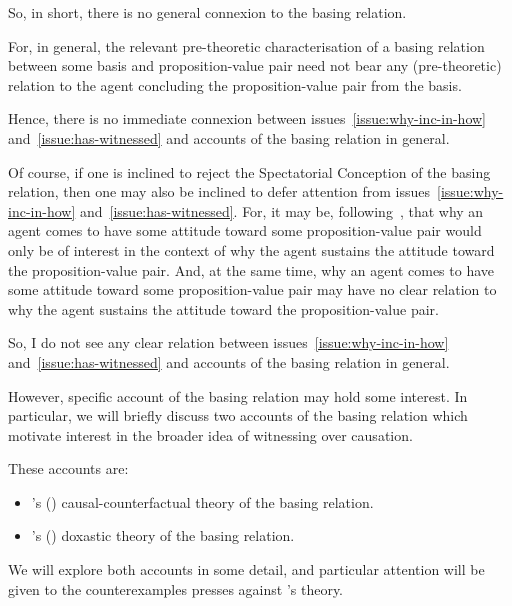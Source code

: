 \begin{note}
  So, in short, there is no general connexion to the basing relation.

  For, in general, the relevant pre-theoretic characterisation of a basing relation between some basis and proposition-value pair need not bear any (pre-theoretic) relation to the agent concluding the proposition-value pair from the basis.

  Hence, there is no immediate connexion between issues~\ref{issue:why-inc-in-how} and~\ref{issue:has-witnessed} and accounts of the basing relation in general.

  Of course, if one is inclined to reject the Spectatorial Conception of the basing relation, then one may also be inclined to defer attention from issues~\ref{issue:why-inc-in-how} and~\ref{issue:has-witnessed}.
  For, it may be, following~\citeauthor{Evans:2013tw}, that why an agent comes to have some attitude toward some proposition-value pair would only be of interest in the context of why the agent sustains the attitude toward the proposition-value pair.
  And, at the same time, why an agent comes to have some attitude toward some proposition-value pair may have no clear relation to why the agent sustains the attitude toward the proposition-value pair.
\end{note}

\begin{note}
  So, I do not see any clear relation between issues~\ref{issue:why-inc-in-how} and~\ref{issue:has-witnessed} and accounts of the basing relation in general.

  However, specific account of the basing relation may hold some interest.
  In particular, we will briefly discuss two accounts of the basing relation which motivate interest in the broader idea of witnessing over causation.

  These accounts are:
  \begin{itemize}
  \item
    \citeauthor{Swain:1981wd}'s (\citeyear{Swain:1981wd}) causal-counterfactual theory of the basing relation.
  \item
    \citeauthor{Tolliver:1982us}'s (\citeyear{Tolliver:1982us}) doxastic theory of the basing relation.
  \end{itemize}
  We will explore both accounts in some detail, and particular attention will be given to the counterexamples \citeauthor{Tolliver:1982us} presses against \citeauthor{Swain:1981wd}'s theory.
\end{note}


